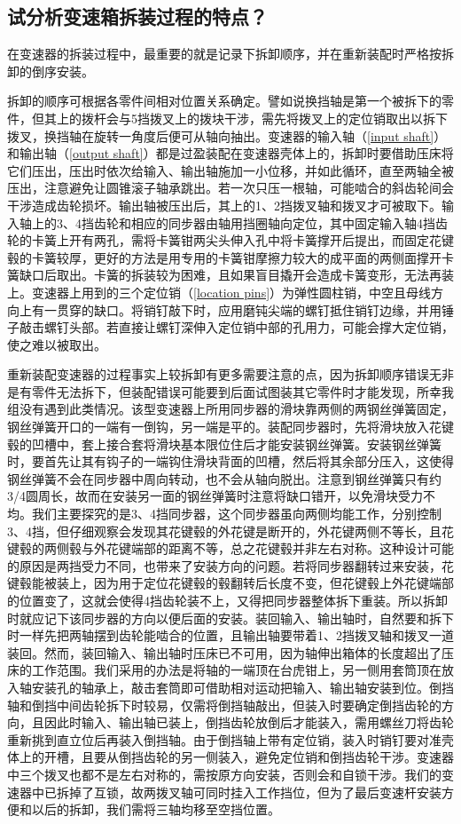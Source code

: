 \documentclass[UTF8]{ctexart}
\numberwithin{figure}{section}
\numberwithin{table}{section}
\begin{document}
\subsection{试分析变速箱拆装过程的特点？}

在变速器的拆装过程中，最重要的就是记录下拆卸顺序，并在重新装配时严格按拆卸的倒序安装。

拆卸的顺序可根据各零件间相对位置关系确定。譬如说换挡轴是第一个被拆下的零件，但其上的拨杆会与5挡拨叉上的拨块干涉，需先将拨叉上的定位销取出以拆下拨叉，换挡轴在旋转一角度后便可从轴向抽出。变速器的输入轴（\cref{input shaft}）和输出轴（\cref{output shaft}）都是过盈装配在变速器壳体上的，拆卸时要借助压床将它们压出，压出时依次给输入、输出轴施加一小位移，并如此循环，直至两轴全被压出，注意避免让圆锥滚子轴承跳出。若一次只压一根轴，可能啮合的斜齿轮间会干涉造成齿轮损坏。输出轴被压出后，其上的1、2挡拨叉轴和拨叉才可被取下。输入轴上的3、4挡齿轮和相应的同步器由轴用挡圈轴向定位，其中固定输入轴4挡齿轮的卡簧上开有两孔，需将卡簧钳两尖头伸入孔中将卡簧撑开后提出，而固定花键毂的卡簧较厚，更好的方法是用专用的卡簧钳摩擦力较大的成平面的两侧面撑开卡簧缺口后取出。卡簧的拆装较为困难，且如果盲目撬开会造成卡簧变形，无法再装上。变速器上用到的三个定位销（\cref{location pins}）为弹性圆柱销，中空且母线方向上有一贯穿的缺口。将销钉敲下时，应用磨钝尖端的螺钉抵住销钉边缘，并用锤子敲击螺钉头部。若直接让螺钉深伸入定位销中部的孔用力，可能会撑大定位销，使之难以被取出。

重新装配变速器的过程事实上较拆卸有更多需要注意的点，因为拆卸顺序错误无非是有零件无法拆下，但装配错误可能要到后面试图装其它零件时才能发现，所幸我组没有遇到此类情况。该型变速器上所用同步器的滑块靠两侧的两钢丝弹簧固定，钢丝弹簧开口的一端有一倒钩，另一端是平的。装配同步器时，先将滑块放入花键毂的凹槽中，套上接合套将滑块基本限位住后才能安装钢丝弹簧。安装钢丝弹簧时，要首先让其有钩子的一端钩住滑块背面的凹槽，然后将其余部分压入，这使得钢丝弹簧不会在同步器中周向转动，也不会从轴向脱出。注意到钢丝弹簧只有约3/4圆周长，故而在安装另一面的钢丝弹簧时注意将缺口错开，以免滑块受力不均。我们主要探究的是3、4挡同步器，这个同步器虽向两侧均能工作，分别控制3、4挡，但仔细观察会发现其花键毂的外花键是断开的，外花键两侧不等长，且花键毂的两侧毂与外花键端部的距离不等，总之花键毂并非左右对称。这种设计可能的原因是两挡受力不同，也带来了安装方向的问题。若将同步器翻转过来安装，花键毂能被装上，因为用于定位花键毂的毂翻转后长度不变，但花键毂上外花键端部的位置变了，这就会使得4挡齿轮装不上，又得把同步器整体拆下重装。所以拆卸时就应记下该同步器的方向以便后面的安装。装回输入、输出轴时，自然要和拆下时一样先把两轴摆到齿轮能啮合的位置，且输出轴要带着1、2挡拨叉轴和拨叉一道装回。然而，装回输入、输出轴时压床已不可用，因为轴伸出箱体的长度超出了压床的工作范围。我们采用的办法是将轴的一端顶在台虎钳上，另一侧用套筒顶在放入轴安装孔的轴承上，敲击套筒即可借助相对运动把输入、输出轴安装到位。倒挡轴和倒挡中间齿轮拆下时较易，仅需将倒挡轴敲出，但装入时要确定倒挡齿轮的方向，且因此时输入、输出轴已装上，倒挡齿轮放倒后才能装入，需用螺丝刀将齿轮重新挑到直立位后再装入倒挡轴。由于倒挡轴上带有定位销，装入时销钉要对准壳体上的开槽，且要从倒挡齿轮的另一侧装入，避免定位销和倒挡齿轮干涉。变速器中三个拨叉也都不是左右对称的，需按原方向安装，否则会和自锁干涉。我们的变速器中已拆掉了互锁，故两拨叉轴可同时挂入工作挡位，但为了最后变速杆安装方便和以后的拆卸，我们需将三轴均移至空挡位置。
\end{document}
